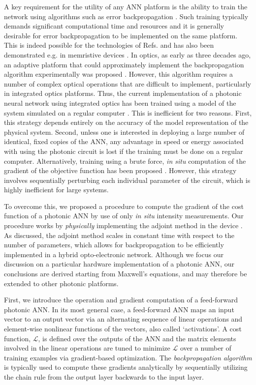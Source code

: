 A key requirement for the utility of any ANN platform is the ability to train the network using algorithms such as error backpropagation \cite{Rumelhart1986}. Such training typically demands significant computational time and resources and it is generally desirable for error backpropagation to be implemented on the same platform. This is indeed possible for the technologies of Refs. \cite{Merolla2014, Graves2016, Hermans2015} and has also been demonstrated e.g. in memristive devices \cite{alibart2013pattern, Prezioso2015}. In optics, as early as three decades ago, an adaptive platform that could approximately implement the backpropagation algorithm experimentally was proposed \cite{wagner1987multilayer,psaltis1988adaptive}. However, this algorithm requires a number of complex optical operations that are difficult to implement, particularly in integrated optics platforms. Thus, the current implementation of a photonic neural network using integrated optics has been trained using a model of the system simulated on a regular computer \cite{shen2017deep}. This is inefficient for two reasons. First, this strategy depends entirely on the accuracy of the model representation of the physical system. Second, unless one is interested in deploying a large number of identical, fixed copies of the ANN, any advantage in speed or energy associated with using the photonic circuit is lost if the training must be done on a regular computer.  Alternatively, training using a brute force, \textit{in situ} computation of the gradient of the objective function has been proposed \cite{shen2017deep}. However, this strategy involves sequentially perturbing each individual parameter of the circuit, which is highly inefficient for large systems.

To overcome this, we proposed \cite{hughes2018training} a procedure to compute the gradient of the cost function of a photonic ANN by use of only \textit{in situ} intensity measurements.    Our procedure works by \textit{physically} implementing the adjoint method in the device \cite{Georgieva2002, Veronis2004, hughes_method_2017}.  As discussed, the adjoint method scales in constant time with respect to the number of parameters, which allows for backpropagation to be efficiently implemented in a hybrid opto-electronic network.  Although we focus our discussion on a particular hardware implementation of a photonic ANN, our conclusions are derived starting from Maxwell’s equations, and may therefore be extended to other photonic platforms.

First, we introduce the operation and gradient computation of a feed-forward photonic ANN.  In its most general case, a feed-forward ANN maps an input vector to an output vector via an alternating sequence of linear operations and element-wise nonlinear functions of the vectors, also called `activations'.  A cost function, $\mathcal{L}$, is defined over the outputs of the ANN and the matrix elements involved in the linear operations are tuned to minimize $\mathcal{L}$ over a number of training examples via gradient-based optimization.  The \textit{backpropagation algorithm} is typically used to compute these gradients analytically by sequentially utilizing the chain rule from the output layer backwards to the input layer.

